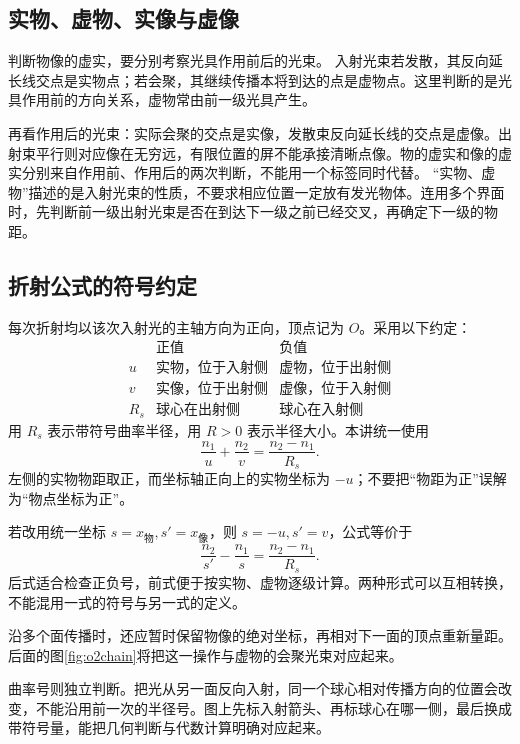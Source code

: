 \subsection{实物、虚物、实像与虚像}

判断物像的虚实，要分别考察光具作用前后的光束。
入射光束若发散，其反向延长线交点是实物点；若会聚，其继续传播本将到达的点是虚物点。这里判断的是光具作用前的方向关系，虚物常由前一级光具产生。

再看作用后的光束：实际会聚的交点是实像，发散束反向延长线的交点是虚像。出射束平行则对应像在无穷远，有限位置的屏不能承接清晰点像。物的虚实和像的虚实分别来自作用前、作用后的两次判断，不能用一个标签同时代替。
“实物、虚物”描述的是入射光束的性质，不要求相应位置一定放有发光物体。连用多个界面时，先判断前一级出射光束是否在到达下一级之前已经交叉，再确定下一级的物距。



\subsection{折射公式的符号约定}

每次折射均以该次入射光的主轴方向为正向，顶点记为 \(O\)。采用以下约定：
\[
\begin{array}{c|c|c}
 &\text{正值}&\text{负值}\\ \hline
u&\text{实物，位于入射侧}&\text{虚物，位于出射侧}\\
v&\text{实像，位于出射侧}&\text{虚像，位于入射侧}\\
R_{\!s}&\text{球心在出射侧}&\text{球心在入射侧}
\end{array}
\]
用 \(R_{\!s}\) 表示带符号曲率半径，用 \(R>0\) 表示半径大小。本讲统一使用
\begin{equation}
 \boxed{\frac{n_1}{u}+\frac{n_2}{v}=\frac{n_2-n_1}{R_{\!s}}}.
 \label{eq:o2sphere}
\end{equation}
左侧的实物物距取正，而坐标轴正向上的实物坐标为 \(-u\)；不要把“物距为正”误解为“物点坐标为正”。

若改用统一坐标 \(s=x_{\text{物}},s'=x_{\text{像}}\)，则 \(s=-u,s'=v\)，公式等价于
\[
 \frac{n_2}{s'}-\frac{n_1}{s}=\frac{n_2-n_1}{R_{\!s}}.
\]
后式适合检查正负号，前式便于按实物、虚物逐级计算。两种形式可以互相转换，不能混用一式的符号与另一式的定义。

沿多个面传播时，还应暂时保留物像的绝对坐标，再相对下一面的顶点重新量距。后面的图\ref{fig:o2chain}将把这一操作与虚物的会聚光束对应起来。

曲率号则独立判断。把光从另一面反向入射，同一个球心相对传播方向的位置会改变，不能沿用前一次的半径号。图上先标入射箭头、再标球心在哪一侧，最后换成带符号量，能把几何判断与代数计算明确对应起来。

